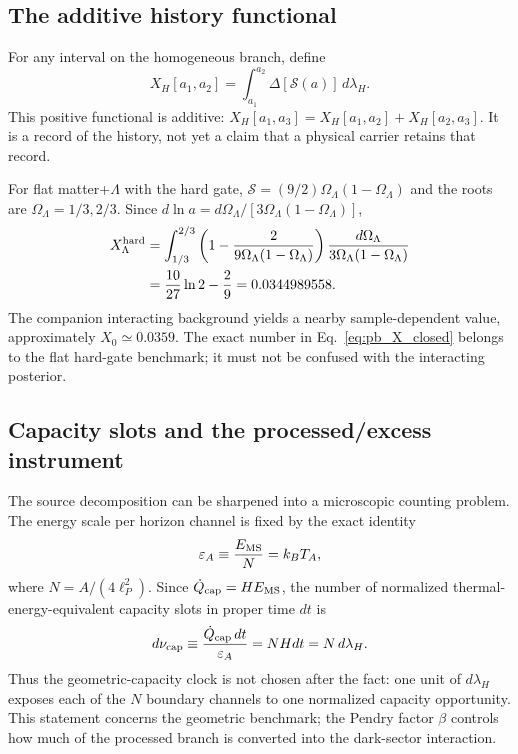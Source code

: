 \documentclass[aps,prd,twocolumn,10pt,superscriptaddress,nofootinbib]{revtex4-2}
\begin{document}
\subsection{The additive history functional}

For any interval on the homogeneous branch, define
\begin{equation}
X_H[a_1,a_2]
=\int_{a_1}^{a_2}\Delta[\mathcal S(a)]\,d\lambda_H.
\label{eq:pb_XH}
\end{equation}
This positive functional is additive:
$X_H[a_1,a_3]=X_H[a_1,a_2]+X_H[a_2,a_3]$.  It is a record of the
history, not yet a claim that a physical carrier retains that record.

For flat matter+$\Lambda$ with the hard gate,
$\mathcal S=(9/2)\Omega_\Lambda(1-\Omega_\Lambda)$ and the roots are
$\Omega_\Lambda=1/3,2/3$.  Since
$d\ln a=d\Omega_\Lambda/[3\Omega_\Lambda(1-\Omega_\Lambda)]$,
\begin{align}
X_\Lambda^{\rm hard}
&=\int_{1/3}^{2/3}
\left(1-\frac{2}{9\Omega_\Lambda(1-\Omega_\Lambda)}\right)
\frac{d\Omega_\Lambda}{3\Omega_\Lambda(1-\Omega_\Lambda)}
\notag\\
&=\frac{10}{27}\ln2-\frac{2}{9}
=0.0344989558.
\label{eq:pb_X_closed}
\end{align}
The companion interacting background yields a nearby sample-dependent
value, approximately $X_0\simeq0.0359$.  The exact number in
Eq.~\eqref{eq:pb_X_closed} belongs to the flat hard-gate benchmark; it
must not be confused with the interacting posterior.

\subsection{Capacity slots and the processed/excess instrument}
\label{sec:pb_write_instrument}

The source decomposition can be sharpened into a microscopic counting
problem.  The energy scale per horizon channel is fixed by the exact
identity
\begin{equation}
\varepsilon_A\equiv\frac{E_{\rm MS}}{N}=k_BT_A,
\label{eq:pb_channel_energy}
\end{equation}
where $N=A/(4\ell_P^2)$.  Since
$\dot Q_{\rm cap}=HE_{\rm MS}$, the number of normalized
thermal-energy-equivalent capacity slots in proper time $dt$ is
\begin{equation}
d\nu_{\rm cap}
\equiv\frac{\dot Q_{\rm cap}\,dt}{\varepsilon_A}
=N Hdt=N\,d\lambda_H.
\label{eq:pb_capacity_slots}
\end{equation}
Thus the geometric-capacity clock is not chosen after the fact: one unit of
$d\lambda_H$ exposes each of the $N$ boundary channels to one normalized
capacity opportunity.  This statement concerns the geometric benchmark;
the Pendry factor $\beta$ controls how much of the processed branch is
converted into the dark-sector interaction.
\end{document}
